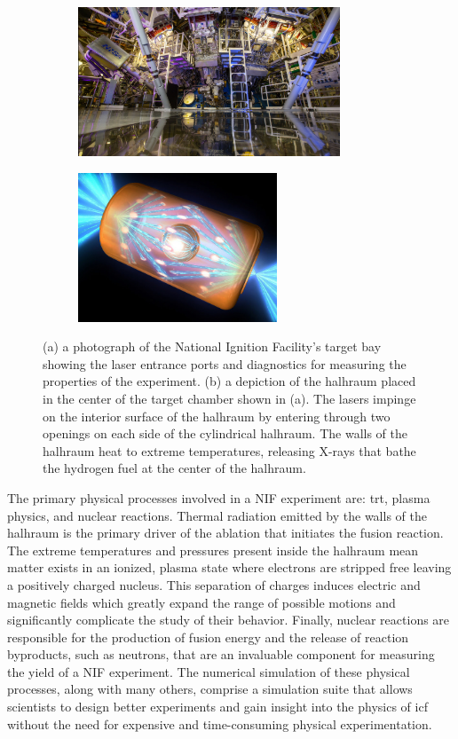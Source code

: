 \documentclass[../doc.tex]{subfiles}
\begin{document}
\begin{figure}
\centering
\begin{subfigure}{.49\textwidth}
	\centering
	\includegraphics[height=1.75in]{data/img/nif.jpg}
	\caption{}
	\label{intro:nif}
\end{subfigure}
\begin{subfigure}{.49\textwidth}
	\centering
	\includegraphics[height=1.75in]{data/img/halhraum.jpeg}
	\caption{}
	\label{intro:halhraum}
\end{subfigure}
\caption{(a) a photograph of the National Ignition Facility's target bay showing the laser entrance ports and diagnostics for measuring the properties of the experiment. (b) a depiction of the halhraum placed in the center of the target chamber shown in (a). The lasers impinge on the interior surface of the halhraum by entering through two openings on each side of the cylindrical halhraum. The walls of the halhraum heat to extreme temperatures, releasing X-rays that bathe the hydrogen fuel at the center of the halhraum. }
\end{figure}

The primary physical processes involved in a NIF experiment are: \gls{trt}, plasma physics, and nuclear reactions. Thermal radiation emitted by the walls of the halhraum is the primary driver of the ablation that initiates the fusion reaction. The extreme temperatures and pressures present inside the halhraum mean matter exists in an ionized, plasma state where electrons are stripped free leaving a positively charged nucleus. This separation of charges induces electric and magnetic fields which greatly expand the range of possible motions and significantly complicate the study of their behavior. Finally, nuclear reactions are responsible for the production of fusion energy and the release of reaction byproducts, such as neutrons, that are an invaluable component for measuring the yield of a NIF experiment. 
The numerical simulation of these physical processes, along with many others, comprise a simulation suite that allows scientists to design better experiments and gain insight into the physics of \gls{icf} without the need for expensive and time-consuming physical experimentation. 
\end{document}
